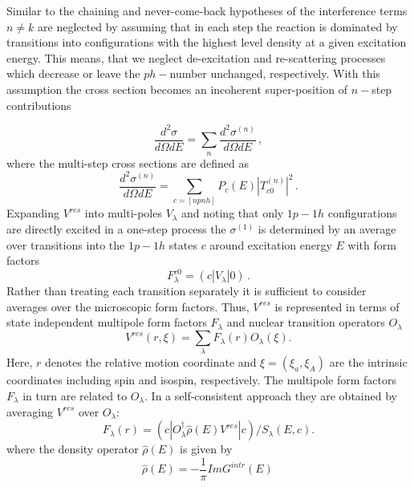 \documentclass[twocolumn,amsmath,amssymb,10pt,groupedaddress,a4paper]{revtex4}
\begin{document}
Similar to the chaining and never-come-back hypotheses of \cite{FKK}
the interference terms $n\ne k$ are neglected by assuming that in
each step the reaction is dominated by transitions into configurations
with the highest level density at a given excitation energy. This
means, that we neglect de-excitation and re-scattering processes which
decrease or leave the $ph-$number unchanged, respectively. With this
assumption the cross section becomes an incoherent super-position
of $n-$step contributions

\begin{equation}
\frac{d^{2}\sigma}{d\Omega dE}=\sum_{n}{\frac{d^{2}\sigma^{(n)}}{d\Omega dE}}\,,\label{sigma0}
\end{equation}
\noindent where the multi-step cross sections are defined as
\begin{equation}
\frac{d^{2}\sigma^{(n)}}{d\Omega dE}=\sum_{c=[npnh]}{P_{c}(E)|T_{c0}^{(n)}|^{2}}\,.\label{sign}
\end{equation}
\noindent Expanding $V^{res}$ into multi-poles $V_{\lambda}$ and noting that
only $1p-1h$ configurations are directly excited in a one-step process
the $\sigma^{(1)}$ is determined by an average over transitions into
the $1p-1h$ states $c$ around excitation energy $E$ with form factors
\begin{equation}
F_{\lambda}^{c0}=(c|V_{\lambda}|0)\,.
\end{equation}
\noindent Rather than treating each transition separately it is sufficient to
consider averages over the microscopic form factors. Thus, $V^{res}$
is represented in terms of state independent multipole form factors
$F_{\lambda}$ and nuclear transition operators $O_{\lambda}$
\begin{equation}
V^{res}(r,\xi)=\sum_{\lambda}{F_{\lambda}(r)O_{\lambda}(\xi)}.\label{vres}
\end{equation}
\noindent Here, $r$ denotes the relative motion coordinate and $\xi=(\xi_{a},\xi_{A})$
are the intrinsic coordinates including spin and isospin, respectively.
The multipole form factors $F_{\lambda}$ in turn are related to $O_{\lambda}$.
In a self-consistent approach they are obtained by averaging $V^{res}$
over $O_{\lambda}$:
\begin{equation}
F_{\lambda}(r)=(c|O_{\lambda}^{\dag}\hat{\rho}(E)V^{res}|c)/S_{\lambda}(E,c).\label{formf}
\end{equation}
\noindent where the density operator $\hat{\rho}(E)$ is given by
\begin{equation}
\hat{\rho}(E)=-\frac{1}{\pi}Im G^{intr}(E)\,\label{specd}
\end{equation}
\end{document}
